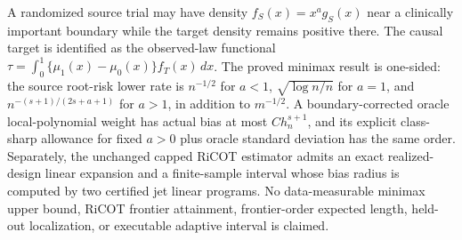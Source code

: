 A randomized source trial may have density \(f_S(x)=x^a g_S(x)\) near a clinically important boundary while the target density remains positive there. The causal target is identified as the observed-law functional \(\tau=\int_0^1\{\mu_1(x)-\mu_0(x)\}f_T(x)\,dx\). The proved minimax result is one-sided: the source root-risk lower rate is \(n^{-1/2}\) for \(a<1\), \(\sqrt{\log n/n}\) for \(a=1\), and \(n^{-(s+1)/(2s+a+1)}\) for \(a>1\), in addition to \(m^{-1/2}\). A boundary-corrected oracle local-polynomial weight has actual bias at most \(C h_n^{s+1}\), and its explicit class-sharp allowance for fixed \(a>0\) plus oracle standard deviation has the same order. Separately, the unchanged capped RiCOT estimator admits an exact realized-design linear expansion and a finite-sample interval whose bias radius is computed by two certified jet linear programs. No data-measurable minimax upper bound, RiCOT frontier attainment, frontier-order expected length, held-out localization, or executable adaptive interval is claimed.